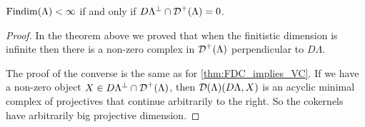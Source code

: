 \begin{theorem}\cite[Theorem~4.4]{Rick19}
	$\operatorname{Findim}(\Lambda) < \infty$ if and only if $D\Lambda^\perp \cap \operatorname{\mathcal{D}}^+(\Lambda) = 0$.
	\begin{proof}
		In the theorem above we proved that when the finitistic dimension is infinite then there is a non-zero complex in $\operatorname{\mathcal{D}}^+(\Lambda)$ perpendicular to $D\Lambda$. 
		
		The proof of the converse is the same as for \cref{thm:FDC_implies_VC}. If we have a non-zero object $X \in D\Lambda^\perp \cap \operatorname{\mathcal{D}}^+(\Lambda)$, then $\operatorname{\mathcal{D}}(\Lambda)(D\Lambda, X)$ is an acyclic minimal complex of projectives that continue arbitrarily to the right. So the cokernels have arbitrarily big projective dimension. 
	\end{proof}
\end{theorem}
